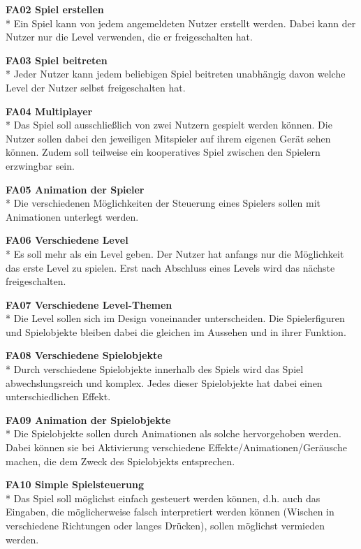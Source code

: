\textbf{FA02 Spiel erstellen}\\*
Ein Spiel kann von jedem angemeldeten Nutzer erstellt werden. Dabei kann der Nutzer nur die Level verwenden, die er freigeschalten hat.

\textbf{FA03 Spiel beitreten}\\*
Jeder Nutzer kann jedem beliebigen Spiel beitreten unabhängig davon welche Level der Nutzer selbst freigeschalten hat.

\textbf{FA04 Multiplayer}\\*
Das Spiel soll ausschließlich von zwei Nutzern gespielt werden können. Die Nutzer sollen dabei den jeweiligen Mitspieler auf ihrem eigenen Gerät sehen können. Zudem soll teilweise ein kooperatives Spiel zwischen den Spielern erzwingbar sein.

\textbf{FA05 Animation der Spieler}\\*
Die verschiedenen Möglichkeiten der Steuerung eines Spielers sollen mit Animationen unterlegt werden. 

\textbf{FA06 Verschiedene Level}\\*
Es soll mehr als ein Level geben. Der Nutzer hat anfangs nur die Möglichkeit das erste Level zu spielen. Erst nach Abschluss eines Levels wird das nächste freigeschalten.

\textbf{FA07 Verschiedene Level-Themen}\\*
Die Level sollen sich im Design voneinander unterscheiden. Die Spielerfiguren und Spielobjekte bleiben dabei die gleichen im Aussehen und in ihrer Funktion.

\textbf{FA08 Verschiedene Spielobjekte}\\*
Durch verschiedene Spielobjekte innerhalb des Spiels wird das Spiel abwechslungsreich und komplex. Jedes dieser Spielobjekte hat dabei einen unterschiedlichen Effekt.

\textbf{FA09 Animation der Spielobjekte}\\*
Die Spielobjekte sollen durch Animationen als solche hervorgehoben werden. Dabei können sie bei Aktivierung verschiedene Effekte/Animationen/Geräusche machen, die dem Zweck des Spielobjekts entsprechen.

\textbf{FA10 Simple Spielsteuerung}\\*
Das Spiel soll möglichst einfach gesteuert werden können, d.h. auch das Eingaben, die möglicherweise falsch interpretiert werden können (Wischen in verschiedene Richtungen oder langes Drücken), sollen möglichst vermieden werden.


